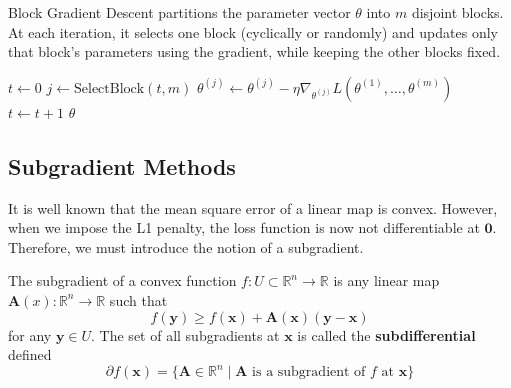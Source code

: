   \begin{algo}
    Block Gradient Descent partitions the parameter vector $\theta$ into $m$ disjoint blocks. At each iteration, it selects one block (cyclically or randomly) and updates only that block's parameters using the gradient, while keeping the other blocks fixed. 
    \begin{algorithm}[H]
    \label{alg:block_gd}
    \begin{algorithmic}[1]  %

        \State $t \gets 0$
          \State $j \gets \text{SelectBlock}(t, m)$ 
          \State $\theta^{(j)} \gets \theta^{(j)} - \eta \nabla_{\theta^{(j)}} L(\theta^{(1)}, \dots, \theta^{(m)})$
          \State $t \gets t + 1$
        \EndWhile
        \State \Return $\theta$
      \EndProcedure
    \end{algorithmic}
    \end{algorithm}
  \end{algo}

\subsection{Subgradient Methods}

  It is well known that the mean square error of a linear map is convex. However, when we impose the L1 penalty, the loss function is now not differentiable at $\mathbf{0}$. Therefore, we must introduce the notion of a subgradient. 

  \begin{definition}[Subgradient]
    The subgradient of a convex function $f: U \subset \mathbb{R}^n \rightarrow \mathbb{R}$ is any linear map $\mathbf{A} (x): \mathbb{R}^n \rightarrow \mathbb{R}$ such that 
    \begin{equation}
      f(\mathbf{y}) \geq f(\mathbf{x}) + \mathbf{A}(\mathbf{x}) (\mathbf{y} - \mathbf{x})
    \end{equation}
    for any $\mathbf{y} \in U$. The set of all subgradients at $\mathbf{x}$ is called the \textbf{subdifferential} defined 
    \begin{equation}
      \partial f (\mathbf{x}) = \{ \mathbf{A} \in \mathbb{R}^n \mid \mathbf{A} \text{ is a subgradient of } f \text{ at } \mathbf{x} \}
    \end{equation}
  \end{definition}

